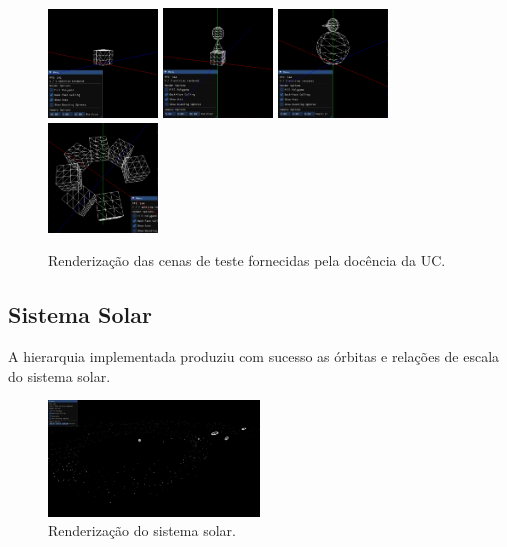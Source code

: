 \documentclass[12pt, a4paper]{article}
\begin{document}
\begin{figure}[H]
    \begin{adjustwidth}{-2cm}{-2cm}
        \centering
        \includegraphics[width=0.26\textwidth]{res/phase2/results/Test1.png}
        \includegraphics[width=0.26\textwidth]{res/phase2/results/Test2.png}
        \includegraphics[width=0.26\textwidth]{res/phase2/results/Test3.png}
        \includegraphics[width=0.26\textwidth]{res/phase2/results/Test4.png}
        \caption{Renderização das cenas de teste fornecidas pela docência da UC.}
    \end{adjustwidth}
\end{figure}

\subsection{Sistema Solar}

A hierarquia implementada produziu com sucesso as órbitas e relações de escala do sistema solar.

\begin{figure}[H]
    \centering
    \includegraphics[width=0.5\textwidth]{res/phase2/results/SolarSystem.png}
    \caption{Renderização do sistema solar.}
\end{figure}
\end{document}
